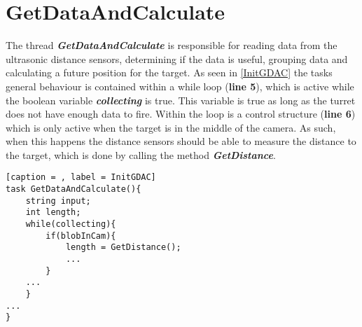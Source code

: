 \section{GetDataAndCalculate}
The thread \textbf{\textit{GetDataAndCalculate}} is responsible for reading data
from the ultrasonic distance sensors, determining if the data is useful,
grouping data and calculating a future position for the target. As seen in
\autoref{InitGDAC} the tasks general behaviour is contained within a while loop
(\textbf{line 5}), which is active while the boolean variable
\textbf{\textit{collecting}} is true. This variable is true as long as the
turret does not have enough data to fire. Within the loop is a control structure
(\textbf{line 6}) which is only active when the target is in the middle of the
camera. As such, when this happens the distance sensors should be able to
measure the distance to the target, which is done by calling the method
\textbf{\textit{GetDistance}}.

\begin{minipage}[H]{\linewidth}
\begin{lstlisting}[caption = , label = InitGDAC]
task GetDataAndCalculate(){
    string input;
    int length;
    while(collecting){
        if(blobInCam){
            length = GetDistance();
            ...
        }
    ...
    }
...
}
\end{lstlisting}
\end{minipage}
